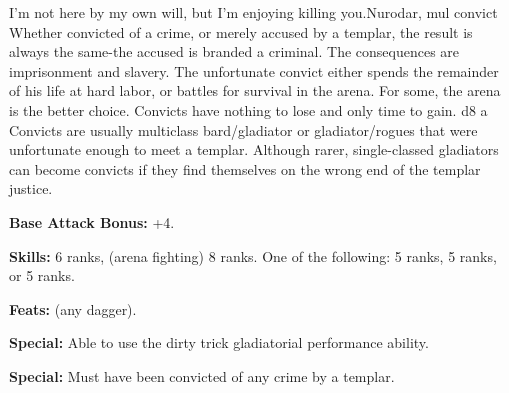 
{I'm not here by my own will, but I'm enjoying killing you.}{Nurodar, mul convict}
{Whether convicted of a crime, or merely accused by a templar, the result is always the same-the accused is branded a criminal. The consequences are imprisonment and slavery. The unfortunate convict either spends the remainder of his life at hard labor, or battles for survival in the arena. For some, the arena is the better choice. Convicts have nothing to lose and only time to gain.}
{d8}
{a}
{Convicts are usually multiclass bard/gladiator or gladiator/rogues that were unfortunate enough to meet a templar. Although rarer, single-classed gladiators can become convicts if they find themselves on the wrong end of the templar justice.}
{
\textbf{Base Attack Bonus:} +4.

\textbf{Skills:}  6 ranks,  (arena fighting) 8 ranks. One of the following:  5 ranks,  5 ranks, or  5 ranks.

\textbf{Feats:}  (any dagger).

\textbf{Special:} Able to use the dirty trick gladiatorial performance ability.

\textbf{Special:} Must have been convicted of any crime by a templar.



}
